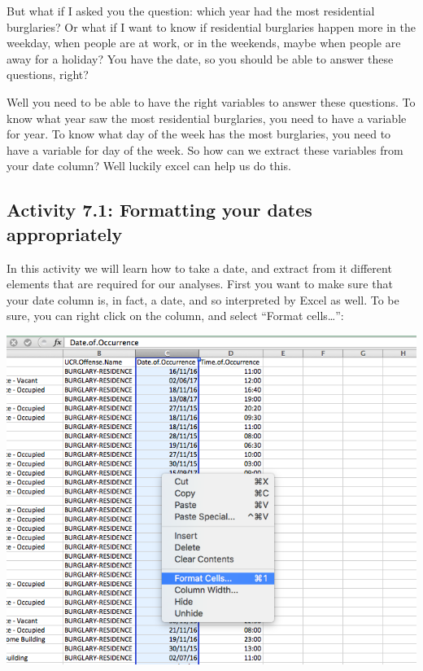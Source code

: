 \documentclass[
]{book}
\begin{document}
But what if I asked you the question: which year had the most residential burglaries? Or what if I want to know if residential burglaries happen more in the weekday, when people are at work, or in the weekends, maybe when people are away for a holiday? You have the date, so you should be able to answer these questions, right?

Well you need to be able to have the right variables to answer these questions. To know what year saw the most residential burglaries, you need to have a variable for year. To know what day of the week has the most burglaries, you need to have a variable for day of the week. So how can we extract these variables from your date column? Well luckily excel can help us do this.

\hypertarget{activity-7.1-formatting-your-dates-appropriately}{%
\subsection{Activity 7.1: Formatting your dates appropriately}\label{activity-7.1-formatting-your-dates-appropriately}}

In this activity we will learn how to take a date, and extract from it different elements that are required for our analyses. First you want to make sure that your date column is, in fact, a date, and so interpreted by Excel as well. To be sure, you can right click on the column, and select ``Format cells\ldots{}'':

\includegraphics{imgs/format_date_1.png}
\end{document}
